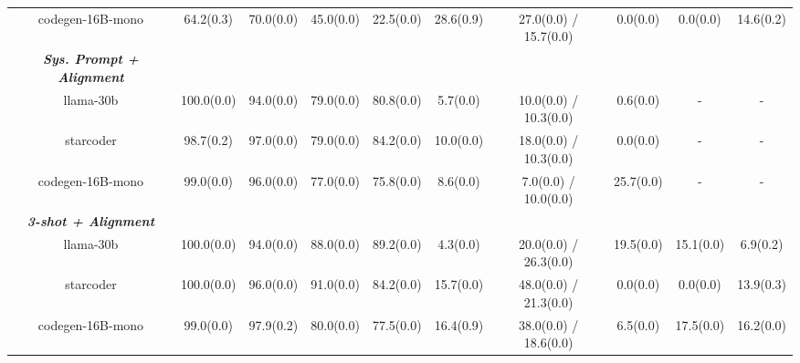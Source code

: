 \begin{table}[]
\begin{adjustbox}{max width=\textwidth}
\begin{tabular}{@{}cccccccccc@{}}
codegen-16B-mono                              & 64.2(0.3)            & 70.0(0.0)            & 45.0(0.0)            & 22.5(0.0)            & 28.6(0.9)            & 27.0(0.0) / 15.7(0.0) & 0.0(0.0)             & 0.0(0.0)             & 14.6(0.2)            \\
\cmidrule(lr){1-10}
\textit{\textbf{Sys. Prompt + Alignment}}     &                      & \multicolumn{1}{l}{} & \multicolumn{1}{l}{} & \multicolumn{1}{l}{} & \multicolumn{1}{l}{} & \multicolumn{1}{l}{}  & \multicolumn{1}{l}{} & \multicolumn{1}{l}{} & \multicolumn{1}{l}{} \\
llama-30b                                     & 100.0(0.0)           & 94.0(0.0)            & 79.0(0.0)            & 80.8(0.0)            & 5.7(0.0)             & 10.0(0.0) / 10.3(0.0) & 0.6(0.0)             & -                    & -                    \\
starcoder                                     & 98.7(0.2)            & 97.0(0.0)            & 79.0(0.0)            & 84.2(0.0)            & 10.0(0.0)            & 18.0(0.0) / 10.3(0.0) & 0.0(0.0)             & -                    & -                    \\
codegen-16B-mono                              & 99.0(0.0)            & 96.0(0.0)            & 77.0(0.0)            & 75.8(0.0)            & 8.6(0.0)             & 7.0(0.0) / 10.0(0.0)  & 25.7(0.0)            & -                    & -                    \\
\cmidrule(lr){1-10}
\textit{\textbf{3-shot + Alignment}}          & \multicolumn{1}{l}{} & \multicolumn{1}{l}{} & \multicolumn{1}{l}{} & \multicolumn{1}{l}{} & \multicolumn{1}{l}{} & \multicolumn{1}{l}{}  & \multicolumn{1}{l}{} & \multicolumn{1}{l}{} & \multicolumn{1}{l}{} \\
llama-30b                                     & 100.0(0.0)           & 94.0(0.0)            & 88.0(0.0)            & 89.2(0.0)            & 4.3(0.0)             & 20.0(0.0) / 26.3(0.0) & 19.5(0.0)            & 15.1(0.0)            & 6.9(0.2)             \\
starcoder                                     & 100.0(0.0)           & 96.0(0.0)            & 91.0(0.0)            & 84.2(0.0)            & 15.7(0.0)            & 48.0(0.0) / 21.3(0.0) & 0.0(0.0)             & 0.0(0.0)             & 13.9(0.3)            \\
codegen-16B-mono                              & 99.0(0.0)            & 97.9(0.2)            & 80.0(0.0)            & 77.5(0.0)            & 16.4(0.9)            & 38.0(0.0) / 18.6(0.0) & 6.5(0.0)             & 17.5(0.0)            & 16.2(0.0)            \\

\end{tabular}
\end{adjustbox}
\end{table}

